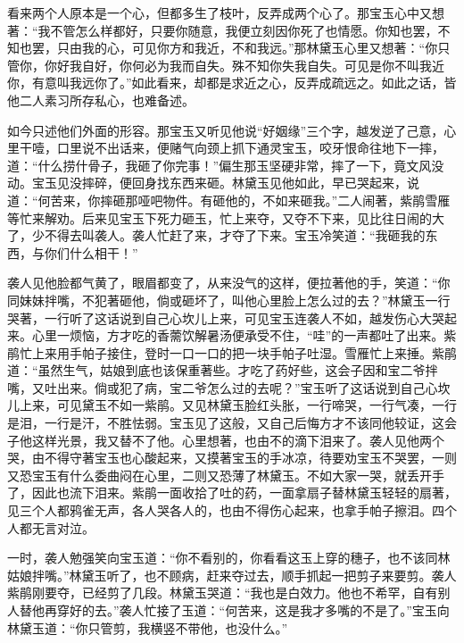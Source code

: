 \begin{parag}


    看来两个人原本是一个心，但都多生了枝叶，反弄成两个心了。那宝玉心中又想著：“我不管怎么样都好，只要你随意，我便立刻因你死了也情愿。你知也罢，不知也罢，只由我的心，可见你方和我近，不和我远。”那林黛玉心里又想著：“你只管你，你好我自好，你何必为我而自失。殊不知你失我自失。可见是你不叫我近你，有意叫我远你了。”如此看来，却都是求近之心，反弄成疏远之。如此之话，皆他二人素习所存私心，也难备述。
\end{parag}


\begin{parag}


    如今只述他们外面的形容。那宝玉又听见他说“好姻缘”三个字，越发逆了己意，心里干噎，口里说不出话来，便赌气向颈上抓下通灵宝玉，咬牙恨命往地下一摔，道：“什么捞什骨子，我砸了你完事！”偏生那玉坚硬非常，摔了一下，竟文风没动。宝玉见没摔碎，便回身找东西来砸。林黛玉见他如此，早已哭起来，说道：“何苦来，你摔砸那哑吧物件。有砸他的，不如来砸我。”二人闹著，紫鹃雪雁等忙来解劝。后来见宝玉下死力砸玉，忙上来夺，又夺不下来，见比往日闹的大了，少不得去叫袭人。袭人忙赶了来，才夺了下来。宝玉冷笑道：“我砸我的东西，与你们什么相干！”
\end{parag}


\begin{parag}


    袭人见他脸都气黄了，眼眉都变了，从来没气的这样，便拉著他的手，笑道：“你同妹妹拌嘴，不犯著砸他，倘或砸坏了，叫他心里脸上怎么过的去？”林黛玉一行哭著，一行听了这话说到自己心坎儿上来，可见宝玉连袭人不如，越发伤心大哭起来。心里一烦恼，方才吃的香薷饮解暑汤便承受不住，“哇”的一声都吐了出来。紫鹃忙上来用手帕子接住，登时一口一口的把一块手帕子吐湿。雪雁忙上来捶。紫鹃道：“虽然生气，姑娘到底也该保重著些。才吃了药好些，这会子因和宝二爷拌嘴，又吐出来。倘或犯了病，宝二爷怎么过的去呢？”宝玉听了这话说到自己心坎儿上来，可见黛玉不如一紫鹃。又见林黛玉脸红头胀，一行啼哭，一行气凑，一行是泪，一行是汗，不胜怯弱。宝玉见了这般，又自己后悔方才不该同他较证，这会子他这样光景，我又替不了他。心里想著，也由不的滴下泪来了。袭人见他两个哭，由不得守著宝玉也心酸起来，又摸著宝玉的手冰凉，待要劝宝玉不哭罢，一则又恐宝玉有什么委曲闷在心里，二则又恐薄了林黛玉。不如大家一哭，就丢开手了，因此也流下泪来。紫鹃一面收拾了吐的药，一面拿扇子替林黛玉轻轻的扇著，见三个人都鸦雀无声，各人哭各人的，也由不得伤心起来，也拿手帕子擦泪。四个人都无言对泣。
\end{parag}


\begin{parag}


    一时，袭人勉强笑向宝玉道：“你不看别的，你看看这玉上穿的穗子，也不该同林姑娘拌嘴。”林黛玉听了，也不顾病，赶来夺过去，顺手抓起一把剪子来要剪。袭人紫鹃刚要夺，已经剪了几段。林黛玉哭道：“我也是白效力。他也不希罕，自有别人替他再穿好的去。”袭人忙接了玉道：“何苦来，这是我才多嘴的不是了。”宝玉向林黛玉道：“你只管剪，我横竖不带他，也没什么。”
\end{parag}


